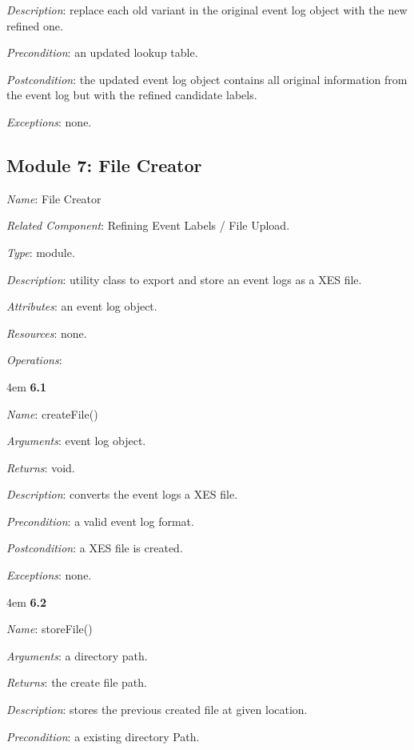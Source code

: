 \documentclass[notitlepage]{article}
\begin{document}
\begin{flushleft}
\textit{Description}: replace each old variant in the original event log object with the new refined one.

\textit{Precondition}: an updated lookup table.

\textit{Postcondition}: the updated event log object contains all original information from the event log but with the refined candidate labels.

\textit{Exceptions}: none.
\par
\endgroup




\subsection{Module 7: File Creator}
\textit{Name}: File Creator

\textit{Related Component}: Refining Event Labels / File Upload.

\textit{Type}: module.

\textit{Description}: utility class to export and store an event logs as a XES file.

\textit{Attributes}: an event log object.

\textit{Resources}: none.

\textit{Operations}: 
\medskip
\par
\begingroup
\leftskip4em
\textbf{6.1} 

\textit{Name}: createFile()

\textit{Arguments}: event log object.

\textit{Returns}: void.

\textit{Description}: converts the event logs a XES file.

\textit{Precondition}: a valid event log format.

\textit{Postcondition}: a XES file is created.

\textit{Exceptions}: none.
\par
\endgroup

\medskip
\par
\begingroup
\leftskip4em
\textbf{6.2} 

\textit{Name}: storeFile()

\textit{Arguments}: a directory path.

\textit{Returns}: the create file path.

\textit{Description}: stores the previous created file at given location.

\textit{Precondition}: a existing directory Path.


\end{flushleft}
\end{document}
